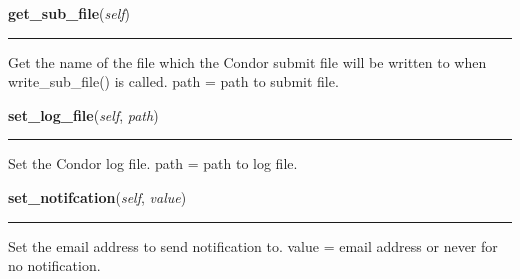     \label{pipeline:CondorJob:get_sub_file}
    \vspace{0.5ex}

    \noindent\begin{boxedminipage}{\textwidth}

    \raggedright \textbf{get\_sub\_file}(\textit{self})

    \vspace{-1.5ex}

    \rule{\textwidth}{0.5\fboxrule}
    Get the name of the file which the Condor submit file will be written 
    to when write\_sub\_file() is called. path = path to submit file.

    \vspace{1ex}

    \end{boxedminipage}

    \label{pipeline:CondorJob:set_log_file}
    \vspace{0.5ex}

    \noindent\begin{boxedminipage}{\textwidth}

    \raggedright \textbf{set\_log\_file}(\textit{self}, \textit{path})

    \vspace{-1.5ex}

    \rule{\textwidth}{0.5\fboxrule}
    Set the Condor log file. path = path to log file.

    \vspace{1ex}

    \end{boxedminipage}

    \label{pipeline:CondorJob:set_notifcation}
    \vspace{0.5ex}

    \noindent\begin{boxedminipage}{\textwidth}

    \raggedright \textbf{set\_notifcation}(\textit{self}, \textit{value})

    \vspace{-1.5ex}

    \rule{\textwidth}{0.5\fboxrule}
    Set the email address to send notification to. value = email address 
    or never for no notification.

    \vspace{1ex}

    \end{boxedminipage}

